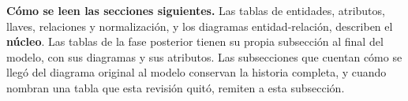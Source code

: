 \textbf{Cómo se leen las secciones siguientes.} Las tablas de entidades, atributos, llaves, relaciones y normalización, y los diagramas entidad-relación, describen el \textbf{núcleo}. Las tablas de la fase posterior tienen su propia subsección al final del modelo, con sus diagramas y sus atributos. Las subsecciones que cuentan cómo se llegó del diagrama original al modelo conservan la historia completa, y cuando nombran una tabla que esta revisión quitó, remiten a esta subsección.
